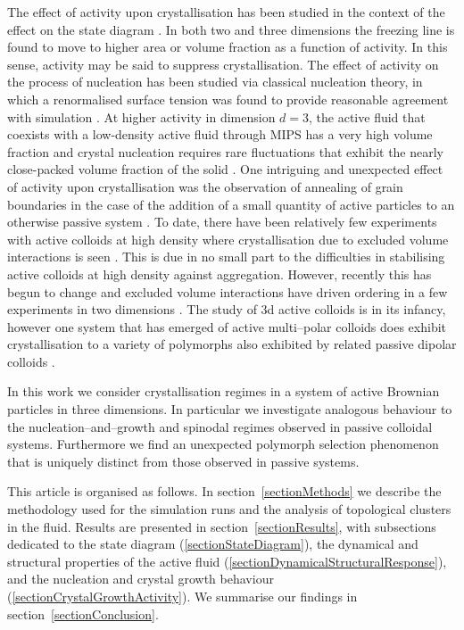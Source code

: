 The effect of activity upon crystallisation has been studied in the context of the effect on the state diagram \cite{mallory2017}. In both  
two \cite{bialke2012,digregorio2018} and three dimensions \cite{wysocki2014,stenhammar2014,omar2021a,turci2021} the freezing line is found to move to higher area or volume fraction as a function of activity. In this sense, activity may be said to suppress crystallisation. The effect of activity on the process of nucleation has been studied via classical nucleation theory, in which a renormalised surface tension was found to provide reasonable agreement with simulation \cite{redner2016}. At higher activity in dimension $d=3$, the active fluid that coexists with a low-density active fluid through MIPS has a very high volume fraction \cite{omar2021a,turci2021} and crystal nucleation requires rare fluctuations that exhibit the nearly close-packed volume fraction of the solid \cite{omar2021a}. One intriguing and unexpected effect of activity upon crystallisation was the observation of annealing of grain boundaries in the case of the addition of a small quantity of active particles to an otherwise passive system \cite{vandermeer2016}. To date, there have been relatively few experiments with active colloids at high density where crystallisation due to excluded volume interactions is seen \cite{pusey1986}. This is due in no small part to the difficulties in stabilising active colloids at high density against aggregation. However, recently this has begun to change and excluded volume interactions have driven ordering in a few experiments in two dimensions \cite{mauleonamieva2020,klongvessa2019,palacci2013,vanderlinden2019}. The study of 3d active colloids is in its infancy, however one system that has emerged of active multi--polar colloids \cite{sakai2020} does exhibit crystallisation to a variety of polymorphs also exhibited by related passive dipolar colloids \cite{yethiraj2003,colla2018}.


In this work we consider crystallisation regimes in a system of active Brownian particles in three dimensions. In particular we investigate analogous behaviour to the nucleation--and--growth and spinodal regimes observed in passive colloidal systems. Furthermore we find an unexpected polymorph selection phenomenon that is uniquely distinct from those observed in passive systems. 

This article is organised as follows. In section~\ref{sectionMethods} we describe the methodology used for the simulation runs and the analysis of topological clusters in the fluid. Results are presented in section~\ref{sectionResults}, with subsections dedicated to the state diagram (\ref{sectionStateDiagram}), the dynamical and structural properties of the active fluid (\ref{sectionDynamicalStructuralResponse}), and the nucleation and crystal growth behaviour (\ref{sectionCrystalGrowthActivity}). We summarise our findings in section~\ref{sectionConclusion}.

